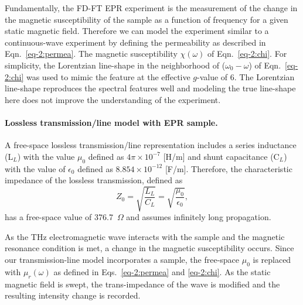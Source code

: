 Fundamentally, the FD-FT EPR experiment is the measurement of the change in the magnetic susceptibility of the sample as a function of frequency for a given static magnetic field. Therefore we can model the experiment similar to a continuous-wave experiment by defining the permeability as described in Eqn.~\ref{eq-2:permea}. The magnetic susceptibility $\chi(\omega)$ of Eqn.~\ref{eq-2:chi}. For simplicity, the Lorentzian line-shape in the neighborhood of ($\omega_0-\omega$) of Eqn.~\ref{eq-2:chi} was used to mimic the feature at the effective $g$-value of 6. The Lorentzian line-shape reproduces the spectral features well and modeling the true line-shape here does not improve the understanding of the experiment. 

\noindent \paragraph*{Lossless transmission\-/line model with EPR sample.} A free-space lossless transmission\-/line representation includes a series inductance (L$_L$) with the value $\mu_0$ defined as $4 \pi \times 10^{-7}$ [H/m] and shunt capacitance (C$_L$) with the value of $\epsilon_0$ defined as $8.854 \times 10^{-12}$ [F/m]. \cite{ramo1984fields} Therefore, the characteristic impedance of the lossless transmission, defined as
\begin{equation}
    Z_0 = \sqrt{\frac{L_L}{C_L}} = \sqrt{\frac{\mu_0}{\epsilon_0}},
\end{equation}
has a free-space value of 376.7~$\Omega$ and assumes infinitely long propagation. 

As the THz electromagnetic wave interacts with the sample and the magnetic resonance condition is met, a change in the magnetic susceptibility occurs. Since our transmission-line model incorporates a sample, the free-space $\mu_0$ is replaced with $\mu_r(\omega)$ as defined in Eqs.~\ref{eq-2:permea} and \ref{eq-2:chi}. As the static magnetic field is swept, the trans-impedance of the wave is modified and the resulting intensity change is recorded.

